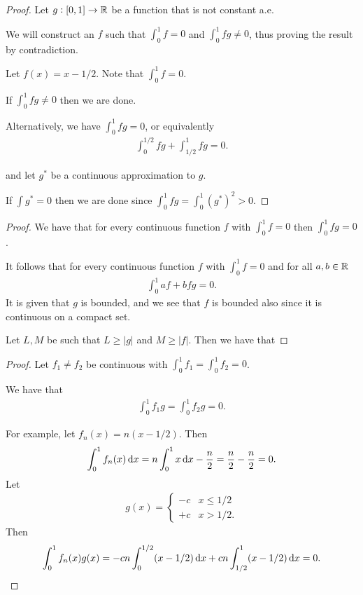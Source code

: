 \begin{proof}
  Let $g: [0, 1] \to \mathbb{R}$ be a function that is not constant a.e.

  We will construct an $f$ such that $\int_0^1 f = 0$ and $\int_0^1 fg \neq 0$, thus proving the result by
  contradiction.

  Let $f(x) = x - 1/2$. Note that $\int_0^1 f = 0$.

  If $\int_0^1 fg \neq 0$ then we are done.

  Alternatively, we have $\int_0^1 fg = 0$, or equivalently
  \begin{align*}
    \int_0^{1/2} fg + \int_{1/2}^1 fg = 0.
  \end{align*}


  and let $g^*$ be a continuous approximation to $g$.



  If $\int g^* = 0$ then we are done since $\int_0^1 fg = \int_0^1 (g^*)^2 > 0$.


\end{proof}


\begin{proof}
  We have that for every continuous function $f$ with $\int_0^1 f = 0$ then $\int_0^1 fg = 0$.

  It follows that for every continuous function $f$ with $\int_0^1 f = 0$ and for all $a, b \in \mathbb{R}$
  \begin{align*}
    \int_0^1 af + bfg = 0.
  \end{align*}
  It is given that $g$ is bounded, and we see that $f$ is bounded also since it is continuous on a compact set.

  Let $L, M$ be such that $L \geq |g|$ and $M \geq |f|$. Then we have that


\end{proof}


\begin{proof}
  Let $f_1 \neq f_2$ be continuous with $\int_0^1 f_1 = \int_0^1 f_2 = 0$.

  We have that
  \begin{align*}
    \int_0^1 f_1g = \int_0^1 f_2g = 0.
  \end{align*}

  For example, let $f_n(x) = n(x - 1/2)$. Then
  \begin{align*}
    \int_0^1 f_n(x) \dx = n\int_0^1 x \dx - \frac{n}{2} = \frac{n}{2} - \frac{n}{2} = 0.
  \end{align*}
  Let
  \begin{align*}
    g(x) =
    \begin{cases}
      -c & x \leq 1/2 \\
      +c  & x > 1/2.
  \end{cases}
  \end{align*}
  Then
  \begin{align*}
    \int_0^1 f_n(x) g(x)
    = -cn\int_0^{1/2}(x - 1/2) \dx + cn\int_{1/2}^1(x - 1/2) \dx
    = 0.
  \end{align*}
\end{proof}








